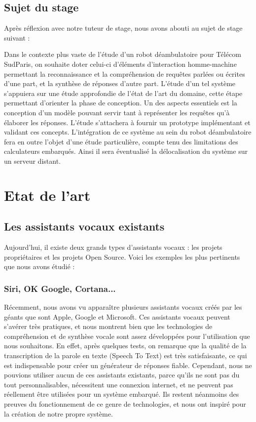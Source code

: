 \documentclass[a4paper,10pt]{report}
\begin{document}
    \section{Sujet du stage}

    {Après réflexion avec notre tuteur de stage, nous avons abouti au sujet de stage suivant :}

    {Dans le contexte plus vaste de l'étude d'un robot déambulatoire pour
        Télécom SudParis, on souhaite doter celui-ci d'éléments d'interaction
        homme-machine permettant la reconnaissance et la compréhension de
        requêtes parlées ou écrites d'une part, et la synthèse de réponses
        d'autre part.}
    {L'étude d'un tel système s'appuiera sur une étude approfondie de l'état
        de l'art du domaine, cette étape permettant d'orienter la phase de
        conception. Un des aspects essentiels est la conception d'un modèle pouvant servir tant à
        représenter les requêtes qu'à élaborer les réponses. L'étude s'attachera
        à fournir un prototype implémentant et validant ces concepts.
        L'intégration de ce système au sein du robot déambulatoire fera en outre
        l'objet d'une étude particulière, compte tenu des limitations des
        calculateurs embarqués. Ainsi il sera éventualisé la délocalisation du
        système sur un serveur distant.}


    \chapter{Etat de l'art}
    \section{Les assistants vocaux existants}
    {Aujourd'hui, il existe deux grands types d'assistants vocaux : les projets propriétaires et les projets Open Source. Voici
        les exemples les plus pertinents que nous avons étudié :}
      \subsection{Siri, OK Google, Cortana...}
      {Récemment, nous avons vu apparaître plusieurs assistants vocaux créés par les géants que sont Apple, Google et Microsoft.
          Ces assistants vocaux peuvent s'avérer très pratiques, et nous montrent bien que les technologies de compréhension et de
          synthèse vocale sont assez développées pour l'utilisation que nous souhaitons. En effet, après quelques tests, on remarque
          que la qualité de la transcription de la parole en texte (Speech To Text) est très satisfaisante, ce qui est indispensable pour
          créer un générateur de réponses fiable.}
      {Cependant, nous ne pouvions utiliser aucun de ces assistants existants, parce qu'ils ne sont pas du tout personnalisables,
          nécessitent une connexion internet, et ne peuvent pas réellement être utilisées pour un système embarqué. Ils restent néanmoins
          des preuves du fonctionnement de ce genre de technologies, et nous ont inspiré pour la création de notre propre système.}
\end{document}
